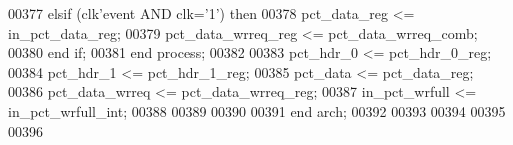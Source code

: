 \begin{DoxyCode}
00377    \textcolor{keywordflow}{elsif} \textcolor{vhdlchar}{(}\textcolor{vhdlchar}{clk}\textcolor{vhdlchar}{'}\textcolor{vhdlkeyword}{event} \textcolor{keywordflow}{AND} \textcolor{vhdlchar}{clk}\textcolor{vhdlchar}{=}\textcolor{vhdlchar}{'}\textcolor{vhdllogic}{}\textcolor{vhdllogic}{1}\textcolor{vhdlchar}{'}\textcolor{vhdlchar}{)} \textcolor{keywordflow}{then} 
00378       \textcolor{vhdlchar}{pct_data_reg}         \textcolor{vhdlchar}{<=} \textcolor{vhdlchar}{in_pct_data_reg};      
00379       \textcolor{vhdlchar}{pct_data_wrreq_reg}   \textcolor{vhdlchar}{<=} \textcolor{vhdlchar}{pct_data_wrreq_comb};
00380    \textcolor{keywordflow}{end} \textcolor{keywordflow}{if};
00381 \textcolor{keywordflow}{end} \textcolor{keywordflow}{process};
00382 
00383 \textcolor{vhdlchar}{pct_hdr_0}      \textcolor{vhdlchar}{<=} \textcolor{vhdlchar}{pct_hdr_0_reg};
00384 \textcolor{vhdlchar}{pct_hdr_1}      \textcolor{vhdlchar}{<=} \textcolor{vhdlchar}{pct_hdr_1_reg};
00385 \textcolor{vhdlchar}{pct_data}       \textcolor{vhdlchar}{<=} \textcolor{vhdlchar}{pct_data_reg};
00386 \textcolor{vhdlchar}{pct_data_wrreq} \textcolor{vhdlchar}{<=} \textcolor{vhdlchar}{pct_data_wrreq_reg};
00387 \textcolor{vhdlchar}{in_pct_wrfull}  \textcolor{vhdlchar}{<=} \textcolor{vhdlchar}{in_pct_wrfull_int};
00388 
00389 
00390 
00391 \textcolor{keywordflow}{end} \textcolor{vhdlchar}{arch};   
00392 
00393 
00394 
00395 
00396 
\end{DoxyCode}
